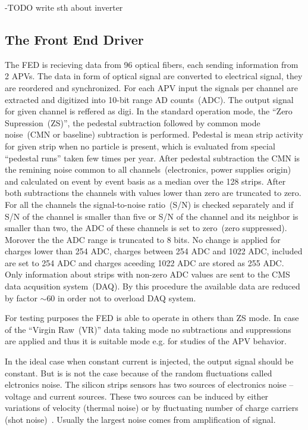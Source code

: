 -TODO write sth about inverter

\subsection{The Front End Driver}



The FED is recieving data from 96 optical fibers, each sending information from 2 APVs. The data in form of optical signal are converted to electrical signal, they are reordered and synchronized. For each APV input the signals per channel are extracted and digitized into 10-bit range AD counts~(ADC). The output signal for given channel is reffered as digi. In the standard operation mode, the ``Zero Supression~(ZS)'', the pedestal subtraction followed by common mode noise~(CMN or baseline) subtraction is performed. Pedestal is mean strip activity for given strip when no particle is present, which is evaluated from special ``pedestal runs'' taken few times per year. After pedestal subtraction the CMN is the remining noise common to all channels~(electronics, power supplies origin) and calculated on event by event basis as a median over the 128 strips. After both subtractions the channels with values lower than zero are truncated to zero. For all the channels the signal-to-noise ratio~(S/N) is checked separately and if S/N of the channel is smaller than five or S/N of the channel and its neighbor is smaller than two, the ADC of these channels is set to zero~(zero suppressed). Morover the the ADC range is truncated to 8 bits. No change is applied for charges lower than 254 ADC, charges between 254 ADC and 1022 ADC, included are set to 254 ADC and charges aceeding 1022 ADC are stored as 255 ADC. Only information about strips with non-zero ADC values are sent to the CMS data acqusition system~(DAQ). By this procedure the available data are reduced by factor $\sim$60 in order not to overload DAQ system.

For testing purposes the FED is able to operate in others than ZS mode. In case of the ``Virgin Raw~(VR)'' data taking mode no subtractions and suppressions are applied and thus it is suitable mode e.g. for studies of the APV behavior.

In the ideal case when constant current is injected, the output signal should be constant. But is is not the case because of the random fluctuations called elctronics noise. The silicon strips sensors has two sources of electronics noise -- voltage and current sources. These two sources can be induced by either variations of velocity (thermal noise) or by fluctuating number of charge carriers (shot noise)~\cite{website:noise}. Usually the largest noise comes from amplification of signal. 

